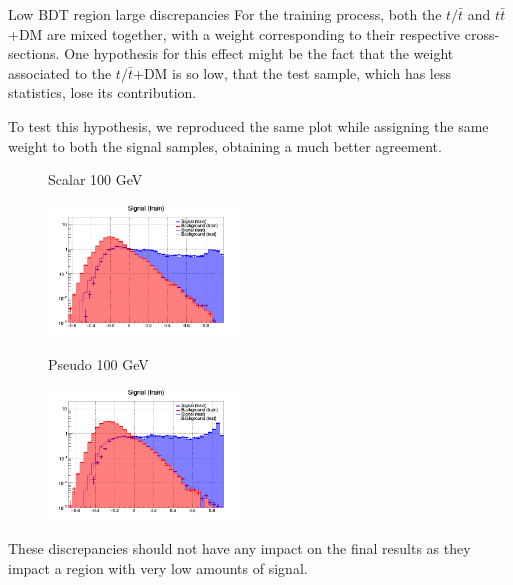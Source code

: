 \documentclass[8pt]{beamer}
\begin{document}
\begin{frame}{Low BDT region large discrepancies}
\justifying
For the training process, both the $t/\bar t$ and $t \bar t$+DM are mixed together, with a weight corresponding to their respective cross-sections. One hypothesis for this effect might be the fact that the weight associated to the $t/\bar t$+DM is so low, that the test sample, which has less statistics, lose its contribution. \vfill

To test this hypothesis, we reproduced the same plot while assigning the same weight to both the signal samples, obtaining a much better agreement. \vfill

\begin{figure}[htbp]
\centering
\begin{minipage}[b]{.49\textwidth}
\vspace{-5pt}
\begin{block}{\centering Scalar 100 GeV}\end{block}
\begin{center}
\includegraphics[width=5.2cm, height=3.5cm]{figs/log_scalar_overtraining_100GeV_TTbar_v2.png}
\end{center}
\end{minipage}
\begin{minipage}[b]{.02\textwidth}\end{minipage}
\begin{minipage}[b]{.49\textwidth}
\vspace{-5pt}
\begin{block}{\centering Pseudo 100 GeV}\end{block}
\begin{center}
\includegraphics[width=5.2cm, height=3.5cm]{figs/log_pseudo_overtraining_100GeV_TTbar_v2.png}
\end{center}
\end{minipage}
\end{figure}

These discrepancies should not have any impact on the final results as they impact a region with very low amounts of signal. \vfill
\end{frame}
\end{document}

